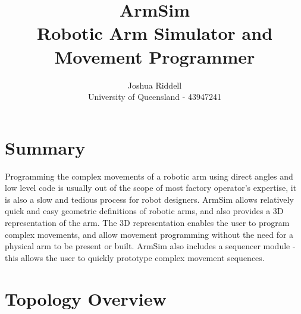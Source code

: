 \documentclass[12pt]{article}
\title{ArmSim \\ \large Robotic Arm Simulator and Movement Programmer}
\author{Joshua Riddell \\ University of Queensland - 43947241}
\begin{document}
\maketitle

\section{Summary} %
\label{sec:summary}

Programming the complex movements of a robotic arm using direct angles and low level code is usually out of the scope of most factory operator's expertise, it is also a slow and tedious process for robot designers. ArmSim allows relatively quick and easy geometric definitions of robotic arms, and also provides a 3D representation of the arm. The 3D representation enables the user to program complex movements, and allow movement programming without the need for a physical arm to be present or built. ArmSim also includes a sequencer module - this allows the user to quickly prototype complex movement sequences.


\section{Topology Overview} %
\label{sec:topology_overview}


\end{document}
